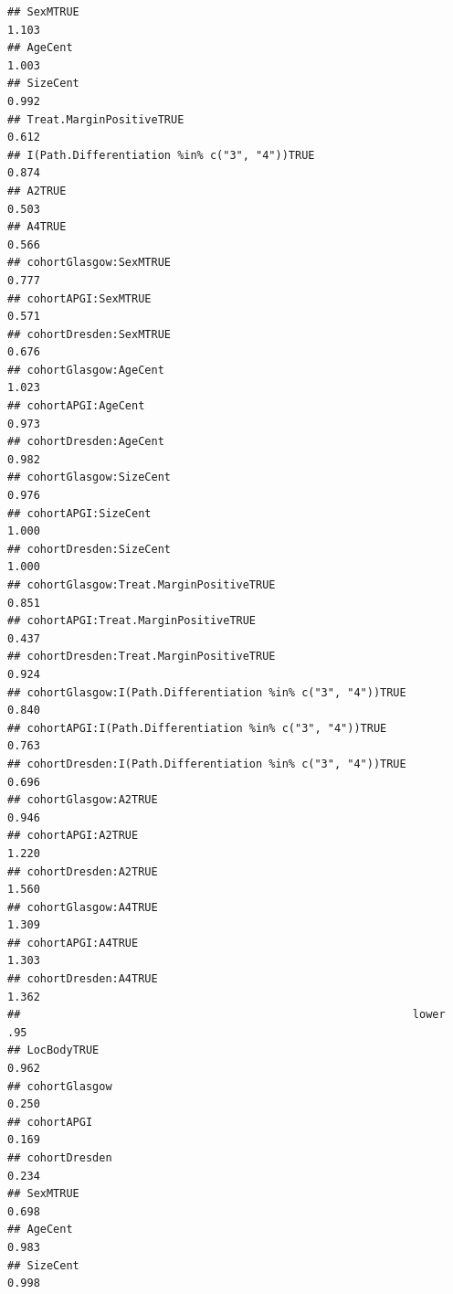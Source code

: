 \documentclass{article}\usepackage[]{graphicx}\usepackage[]{color}
\makeatletter
\newenvironment{kframe}{%
 \def\at@end@of@kframe{}%
 \ifinner\ifhmode%
  \def\at@end@of@kframe{\end{minipage}}%
  \begin{minipage}{\columnwidth}%
 \fi\fi%
 \def\FrameCommand##1{\hskip\@totalleftmargin \hskip-\fboxsep
 \colorbox{shadecolor}{##1}\hskip-\fboxsep
     \hskip-\linewidth \hskip-\@totalleftmargin \hskip\columnwidth}%
 \MakeFramed {\advance\hsize-\width
   \@totalleftmargin\z@ \linewidth\hsize
   \@setminipage}}%
 {\par\unskip\endMakeFramed%
 \at@end@of@kframe}
\newenvironment{knitrout}{}{} %
\makeatother
\begin{document}
\begin{knitrout}
\begin{kframe}
\begin{verbatim}
## SexMTRUE                                                        1.103
## AgeCent                                                         1.003
## SizeCent                                                        0.992
## Treat.MarginPositiveTRUE                                        0.612
## I(Path.Differentiation %in% c("3", "4"))TRUE                    0.874
## A2TRUE                                                          0.503
## A4TRUE                                                          0.566
## cohortGlasgow:SexMTRUE                                          0.777
## cohortAPGI:SexMTRUE                                             0.571
## cohortDresden:SexMTRUE                                          0.676
## cohortGlasgow:AgeCent                                           1.023
## cohortAPGI:AgeCent                                              0.973
## cohortDresden:AgeCent                                           0.982
## cohortGlasgow:SizeCent                                          0.976
## cohortAPGI:SizeCent                                             1.000
## cohortDresden:SizeCent                                          1.000
## cohortGlasgow:Treat.MarginPositiveTRUE                          0.851
## cohortAPGI:Treat.MarginPositiveTRUE                             0.437
## cohortDresden:Treat.MarginPositiveTRUE                          0.924
## cohortGlasgow:I(Path.Differentiation %in% c("3", "4"))TRUE      0.840
## cohortAPGI:I(Path.Differentiation %in% c("3", "4"))TRUE         0.763
## cohortDresden:I(Path.Differentiation %in% c("3", "4"))TRUE      0.696
## cohortGlasgow:A2TRUE                                            0.946
## cohortAPGI:A2TRUE                                               1.220
## cohortDresden:A2TRUE                                            1.560
## cohortGlasgow:A4TRUE                                            1.309
## cohortAPGI:A4TRUE                                               1.303
## cohortDresden:A4TRUE                                            1.362
##                                                            lower .95
## LocBodyTRUE                                                    0.962
## cohortGlasgow                                                  0.250
## cohortAPGI                                                     0.169
## cohortDresden                                                  0.234
## SexMTRUE                                                       0.698
## AgeCent                                                        0.983
## SizeCent                                                       0.998

\end{verbatim}
\end{kframe}
\end{knitrout}
\end{document}
